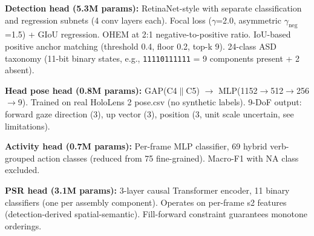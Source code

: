 \documentclass[conference]{IEEEtran}
\begin{document}
\begin{table}[htbp]\centering\small
\caption{Per-component breakdown on RTX 3060 (measured at batch=1, 720$\times$1280).}
\label{tab:params}
\end{table}

\textbf{Detection head (5.3M params):} RetinaNet-style with separate classification and regression subnets (4 conv layers each). Focal loss ($\gamma$=2.0, asymmetric $\gamma_{\text{neg}}$=1.5) + GIoU regression. OHEM at 2:1 negative-to-positive ratio. IoU-based positive anchor matching (threshold 0.4, floor 0.2, top-k 9). 24-class ASD taxonomy (11-bit binary states, e.g., \texttt{11110111111} = 9 components present + 2 absent).

\textbf{Head pose head (0.8M params):} GAP(C4$\|$C5) $\to$ MLP(1152$\to$512$\to$256$\to$9). Trained on real HoloLens 2 pose.csv (no synthetic labels). 9-DoF output: forward gaze direction (3), up vector (3), position (3, unit scale uncertain, see limitations).

\textbf{Activity head (0.7M params):} Per-frame MLP classifier, 69 hybrid verb-grouped action classes (reduced from 75 fine-grained). Macro-F1 with NA class excluded.

\textbf{PSR head (3.1M params):} 3-layer causal Transformer encoder, 11 binary classifiers (one per assembly component). Operates on per-frame s2 features (detection-derived spatial-semantic). Fill-forward constraint guarantees monotone orderings.
\end{document}
